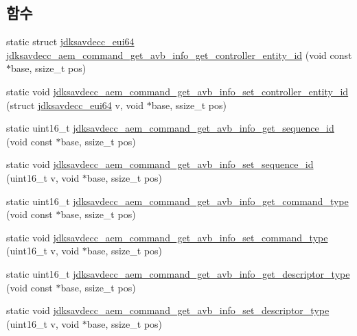 \subsection*{함수}
\begin{DoxyCompactItemize}
\item 
static struct \hyperlink{structjdksavdecc__eui64}{jdksavdecc\+\_\+eui64} \hyperlink{group__command__get__avb__info_ga611d8231cc6f8a57007a4de1ec663c4e}{jdksavdecc\+\_\+aem\+\_\+command\+\_\+get\+\_\+avb\+\_\+info\+\_\+get\+\_\+controller\+\_\+entity\+\_\+id} (void const $\ast$base, ssize\+\_\+t pos)
\item 
static void \hyperlink{group__command__get__avb__info_ga8b44f0c5edef3da6559aa7654e93a514}{jdksavdecc\+\_\+aem\+\_\+command\+\_\+get\+\_\+avb\+\_\+info\+\_\+set\+\_\+controller\+\_\+entity\+\_\+id} (struct \hyperlink{structjdksavdecc__eui64}{jdksavdecc\+\_\+eui64} v, void $\ast$base, ssize\+\_\+t pos)
\item 
static uint16\+\_\+t \hyperlink{group__command__get__avb__info_ga18c2a10179879687df93695d99a180f3}{jdksavdecc\+\_\+aem\+\_\+command\+\_\+get\+\_\+avb\+\_\+info\+\_\+get\+\_\+sequence\+\_\+id} (void const $\ast$base, ssize\+\_\+t pos)
\item 
static void \hyperlink{group__command__get__avb__info_gac509d192a7039a1b802049c2a379d233}{jdksavdecc\+\_\+aem\+\_\+command\+\_\+get\+\_\+avb\+\_\+info\+\_\+set\+\_\+sequence\+\_\+id} (uint16\+\_\+t v, void $\ast$base, ssize\+\_\+t pos)
\item 
static uint16\+\_\+t \hyperlink{group__command__get__avb__info_gabb2afae06ae1e81ff1a2e27c5a213935}{jdksavdecc\+\_\+aem\+\_\+command\+\_\+get\+\_\+avb\+\_\+info\+\_\+get\+\_\+command\+\_\+type} (void const $\ast$base, ssize\+\_\+t pos)
\item 
static void \hyperlink{group__command__get__avb__info_gaa8e75428f70ada1124b5bbbac27ae7dd}{jdksavdecc\+\_\+aem\+\_\+command\+\_\+get\+\_\+avb\+\_\+info\+\_\+set\+\_\+command\+\_\+type} (uint16\+\_\+t v, void $\ast$base, ssize\+\_\+t pos)
\item 
static uint16\+\_\+t \hyperlink{group__command__get__avb__info_ga6bf96b17e843dc9e6da3c6961cb6472f}{jdksavdecc\+\_\+aem\+\_\+command\+\_\+get\+\_\+avb\+\_\+info\+\_\+get\+\_\+descriptor\+\_\+type} (void const $\ast$base, ssize\+\_\+t pos)
\item 
static void \hyperlink{group__command__get__avb__info_ga858dc0a7b8713f92f32d8808b9944f32}{jdksavdecc\+\_\+aem\+\_\+command\+\_\+get\+\_\+avb\+\_\+info\+\_\+set\+\_\+descriptor\+\_\+type} (uint16\+\_\+t v, void $\ast$base, ssize\+\_\+t pos)

\end{DoxyCompactItemize}
